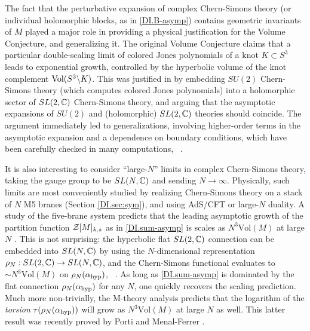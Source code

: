 \documentclass[12pt]{article}
\begin{document}
The fact that the perturbative expansion of complex Chern-Simons theory (or individual holomorphic blocks, as in \eqref{DI.B-asymp}) contains geometric invariants of $M$ played a major role in providing a physical justification for the Volume Conjecture, and generalizing it. The original Volume Conjecture \cite{DIkashaev-1997, DIMur-Mur} claims that a particular double-scaling limit of colored Jones polynomials of a knot $K\subset S^3$ leads to exponential growth, controlled by the hyperbolic volume of the knot complement $\text{Vol}(S^3\backslash K)$. This was justified in \cite{DIgukov-2003} by embedding $SU(2)$ Chern-Simons theory (which computes colored Jones polynomials) into a holomorphic sector of $SL(2,{\mathbb C})$ Chern-Simons theory, and arguing that the asymptotic expansions of $SU(2)$ and (holomorphic) $SL(2,{\mathbb C})$ theories should coincide. The argument immediately led to generalizations, involving higher-order terms in the asymptotic expansion and a dependence on boundary conditions, which have been carefully checked in many computations, \DIcf\ \cite{DIGukovMurakami, DIDGLZ, DIDG-quantumNZ}.





It is also interesting to consider ``large-$N$'' limits in complex Chern-Simons theory, taking the gauge group to be $SL(N,{\mathbb C})$ and sending $N\to\infty$. Physically, such limits are most conveniently studied by realizing Chern-Simons theory on a stack of $N$ M5 branes (Section \ref{DI.sec:sym}), and using AdS/CFT or large-$N$ duality. A study of the five-brane system \cite{DIHenningsonSkenderis, DIHMM-anomalies, DIGKW-5branes} predicts that the leading asymptotic growth of the partition function $\mathcal{Z}[M]_{k,s}$ as in \eqref{DI.sum-asymp} is scales as $N^3\text{Vol}(M)$ at large $N$ \cite{DIDGG-Kdec}. This is not surprising: the hyperbolic flat $SL(2,{\mathbb C})$ connection can be embedded into $SL(N,{\mathbb C})$ by using the $N$-dimensional representation $\rho_N:SL(2,{\mathbb C})\to SL(N,{\mathbb C})$, and the Chern-Simons functional evaluates to $\sim N^3\text{Vol}(M)$ on $\rho_N(\alpha_{\rm hyp})$, \DIcf\ \cite{DIGTZ-slN}. As long as \eqref{DI.sum-asymp} is dominated by the flat connection $\rho_N(\alpha_{\rm hyp})$ for any $N$, one quickly recovers the scaling prediction.
 Much more non-trivially, the M-theory analysis predicts that the logarithm of the \emph{torsion} $\tau(\rho_N(\alpha_{\rm hyp}))$ will grow as $N^3\text{Vol}(M)$ \cite{DIMPS-S3b, DIGKL-largeN} at large $N$ as well. This latter result was recently proved by Porti and Menal-Ferrer \cite{DIPorti-largeN}.
\end{document}
